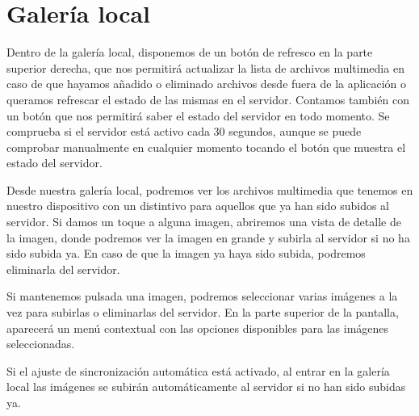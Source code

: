 \section{Galería local}

Dentro de la galería local, disponemos de un botón de refresco en la parte superior derecha, que nos permitirá actualizar la lista de archivos multimedia en caso de que hayamos añadido o eliminado archivos desde fuera de la aplicación o queramos refrescar el estado de las mismas en el servidor. Contamos también con un botón que nos permitirá saber el estado del servidor en todo momento. Se comprueba si el servidor está activo cada 30 segundos, aunque se puede comprobar manualmente en cualquier momento tocando el botón que muestra el estado del servidor.

Desde nuestra galería local, podremos ver los archivos multimedia que tenemos en nuestro dispositivo con un distintivo para aquellos que ya han sido subidos al servidor. Si damos un toque a alguna imagen, abriremos una vista de detalle de la imagen, donde podremos ver la imagen en grande y subirla al servidor si no ha sido subida ya. En caso de que la imagen ya haya sido subida, podremos eliminarla del servidor.

Si mantenemos pulsada una imagen, podremos seleccionar varias imágenes a la vez para subirlas o eliminarlas del servidor. En la parte superior de la pantalla, aparecerá un menú contextual con las opciones disponibles para las imágenes seleccionadas.

Si el ajuste de sincronización automática está activado, al entrar en la galería local las imágenes se subirán automáticamente al servidor si no han sido subidas ya.

